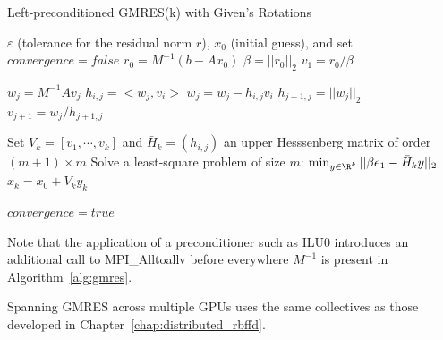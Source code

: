 \begin{algorithm}                      %
\caption{Left-preconditioned GMRES(k) with Given's Rotations}          %
\label{alg:gmres}                           %
\begin{algorithmic}[1]                    %
    \State $\varepsilon$ (tolerance for the residual norm $r$), $x_0$ (initial guess), and set $convergence = false$
    \State $r_0 = M^{-1} (b-Ax_0)$
    \State $\beta = ||r_0||_2$			
    \State $v_1 = r_0 / \beta$ 

	 \label{alg:gmres_rotation_loop_start} 
			\State $w_j = M^{-1} A v_j$   
			\label{alg:gmres_inner_loop_start}
				\State $h_{i,j} = <w_j, v_i>$ 
				\State $w_j = w_j - h_{i,j} v_i$
			\EndFor \label{alg:gmres_inner_loop_stop}
			\State $h_{j+1, j}  = ||w_j||_2$		
			\State $v_{j+1} = w_j / h_{j+1,j}$		
	\EndFor\label{alg:gmres_rotation_loop_stop} 

			\State Set $V_k = [v_1, \cdots, v_k]$ and $\bar{H}_k = (h_{i,j})$ an upper Hesssenberg matrix of order $(m+1)\times m$
			\State \label{alg:gmres_least_squares} Solve a least-square problem of size $m$: $\min_{y \in \R^k} ||\beta e_1 - \bar{H}_k y||_2$	
			\State $x_k = x_0 + V_k y_k$ \label{alg:gmes_residual_norm}

		\State $convergence = true$
	\EndIf
    \EndWhile
\end{algorithmic}
\end{algorithm}



Note that the application of a preconditioner such as ILU0 introduces an additional call to MPI\_Alltoallv before everywhere $M^{-1}$ is present in Algorithm~\ref{alg:gmres}.

Spanning GMRES across multiple GPUs uses the same collectives as those developed in Chapter~\ref{chap:distributed_rbffd}. 


